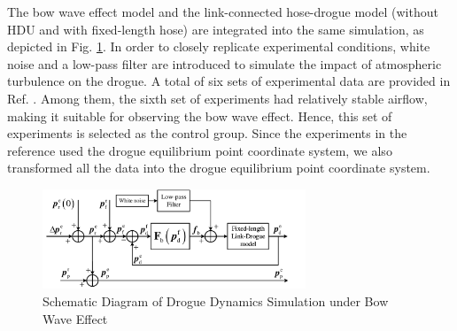 The bow wave effect model and the link-connected hose-drogue model (without HDU and with fixed-length hose) are integrated into the same simulation, as depicted in Fig. \ref{fig4.19}. In order to closely replicate experimental conditions, white noise and a low-pass filter are introduced to simulate the impact of atmospheric turbulence on the drogue. A total of six sets of experimental data are provided in Ref. \cite{dibley_autonomous_2007}. Among them, the sixth set of experiments had relatively stable airflow, making it suitable for observing the bow wave effect. Hence, this set of experiments is selected  as the control group. Since the experiments in the reference used the drogue equilibrium point coordinate system, we also transformed all the data into the drogue equilibrium point coordinate system.
\begin{figure}[th]
	\centering
	\includegraphics[width=0.7\textwidth]{Figures/Figs_Ch4/fig22.pdf}
	\caption{Schematic Diagram of Drogue Dynamics Simulation under Bow Wave Effect}\label{fig4.19}
\end{figure}

